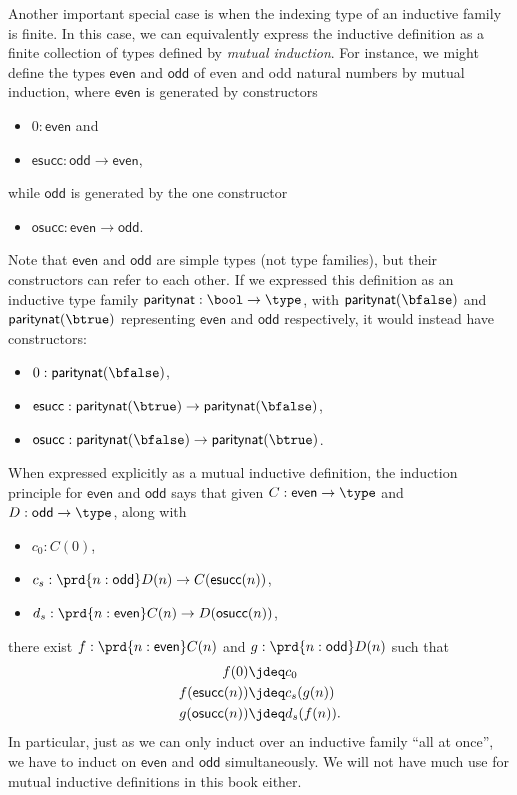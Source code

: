 %
%
Another important special case is when the indexing type of an inductive family is finite.
In this case, we can equivalently express the inductive definition as a finite collection of types defined by \emph{mutual induction}.
For instance, we might define the types $\mathsf{even}$ and $\mathsf{odd}$ of even and odd natural numbers by mutual induction, where $\mathsf{even}$ is generated by constructors
\begin{itemize}
\item $0:\mathsf{even}$ and
\item $\mathsf{esucc} : \mathsf{odd}\to\mathsf{even}$,
\end{itemize}
while $\mathsf{odd}$ is generated by the one constructor
\begin{itemize}
\item $\mathsf{osucc} : \mathsf{even}\to \mathsf{odd}$.
\end{itemize}
Note that $\mathsf{even}$ and $\mathsf{odd}$ are simple types (not type families), but their constructors can refer to each other.
If we expressed this definition as an inductive type family $\mathsf{paritynat} : \bool \to \type$, with $\mathsf{paritynat}(\bfalse)$ and $\mathsf{paritynat}(\btrue)$ representing $\mathsf{even}$ and $\mathsf{odd}$ respectively, it would instead have constructors:
\begin{itemize}
\item $0 : \mathsf{paritynat}(\bfalse)$,
\item $\mathsf{esucc} : \mathsf{paritynat}(\btrue) \to \mathsf{paritynat}(\bfalse)$,
\item $\mathsf{osucc} : \mathsf{paritynat}(\bfalse) \to \mathsf{paritynat}(\btrue)$.
\end{itemize}
When expressed explicitly as a mutual inductive definition, the induction principle for $\mathsf{even}$ and $\mathsf{odd}$ says that given $C:\mathsf{even}\to\type$ and $D:\mathsf{odd}\to\type$, along with
\begin{itemize}
\item $c_0 : C(0)$,
\item $c_s : \prd{n:\mathsf{odd}} D(n) \to C(\mathsf{esucc}(n))$,
\item $d_s : \prd{n:\mathsf{even}} C(n) \to D(\mathsf{osucc}(n))$,
\end{itemize}
there exist $f:\prd{n:\mathsf{even}} C(n)$ and $g:\prd{n:\mathsf{odd}}D(n)$ such that
\begin{align*}
  f(0) &\jdeq c_0\\
  f(\mathsf{esucc}(n)) &\jdeq c_s(g(n))\\
  g(\mathsf{osucc}(n)) &\jdeq d_s(f(n)).
\end{align*}
In particular, just as we can only induct over an inductive family ``all at once'', we have to induct on $\mathsf{even}$ and $\mathsf{odd}$ simultaneously.
We will not have much use for mutual inductive definitions in this book either.

